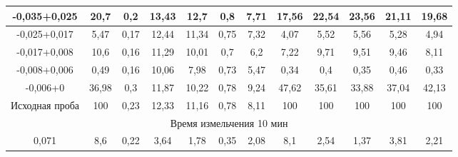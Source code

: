 {\begin{longtable}[c]{|p{}ccccccccccc|}
\multicolumn{1}{|c|}{-0,035+0,025} & \multicolumn{1}{c|}{20,7} & \multicolumn{1}{c|}{0,2} & \multicolumn{1}{c|}{13,43} & \multicolumn{1}{c|}{12,7} & \multicolumn{1}{c|}{0,8} & \multicolumn{1}{c|}{7,71} & \multicolumn{1}{c|}{17,56} & \multicolumn{1}{c|}{22,54} & \multicolumn{1}{c|}{23,56} & \multicolumn{1}{c|}{21,11} & 19,68 \\ \hline
\multicolumn{1}{|c|}{-0,025+0,017} & \multicolumn{1}{c|}{5,47} & \multicolumn{1}{c|}{0,17} & \multicolumn{1}{c|}{12,44} & \multicolumn{1}{c|}{11,34} & \multicolumn{1}{c|}{0,75} & \multicolumn{1}{c|}{7,32} & \multicolumn{1}{c|}{4,07} & \multicolumn{1}{c|}{5,52} & \multicolumn{1}{c|}{5,56} & \multicolumn{1}{c|}{5,28} & 4,94 \\ \hline
\multicolumn{1}{|c|}{-0,017+0,008} & \multicolumn{1}{c|}{10,6} & \multicolumn{1}{c|}{0,16} & \multicolumn{1}{c|}{11,29} & \multicolumn{1}{c|}{10,01} & \multicolumn{1}{c|}{0,7} & \multicolumn{1}{c|}{6,2} & \multicolumn{1}{c|}{7,22} & \multicolumn{1}{c|}{9,71} & \multicolumn{1}{c|}{9,51} & \multicolumn{1}{c|}{9,46} & 8,11 \\ \hline
\multicolumn{1}{|c|}{-0,008+0,006} & \multicolumn{1}{c|}{0,49} & \multicolumn{1}{c|}{0,16} & \multicolumn{1}{c|}{10,06} & \multicolumn{1}{c|}{7,98} & \multicolumn{1}{c|}{0,73} & \multicolumn{1}{c|}{5,47} & \multicolumn{1}{c|}{0,34} & \multicolumn{1}{c|}{0,4} & \multicolumn{1}{c|}{0,35} & \multicolumn{1}{c|}{0,46} & 0,33 \\ \hline
\multicolumn{1}{|c|}{-0,006+0} & \multicolumn{1}{c|}{36,98} & \multicolumn{1}{c|}{0,3} & \multicolumn{1}{c|}{11,87} & \multicolumn{1}{c|}{10,22} & \multicolumn{1}{c|}{0,78} & \multicolumn{1}{c|}{9,24} & \multicolumn{1}{c|}{47,62} & \multicolumn{1}{c|}{35,61} & \multicolumn{1}{c|}{33,88} & \multicolumn{1}{c|}{37,04} & 42,13 \\ \hline
\multicolumn{1}{|c|}{Исходная проба} & \multicolumn{1}{c|}{100} & \multicolumn{1}{c|}{0,23} & \multicolumn{1}{c|}{12,33} & \multicolumn{1}{c|}{11,16} & \multicolumn{1}{c|}{0,78} & \multicolumn{1}{c|}{8,11} & \multicolumn{1}{c|}{100} & \multicolumn{1}{c|}{100} & \multicolumn{1}{c|}{100} & \multicolumn{1}{c|}{100} & 100 \\ \hline
\multicolumn{12}{|c|}{Время измельчения 10 мин} \\ \hline
\multicolumn{1}{|c|}{0,071} & \multicolumn{1}{c|}{8,6} & \multicolumn{1}{c|}{0,22} & \multicolumn{1}{c|}{3,64} & \multicolumn{1}{c|}{1,78} & \multicolumn{1}{c|}{0,35} & \multicolumn{1}{c|}{2,08} & \multicolumn{1}{c|}{8,1} & \multicolumn{1}{c|}{2,54} & \multicolumn{1}{c|}{1,37} & \multicolumn{1}{c|}{3,81} & 2,21 \\ \hline

\end{longtable}}
